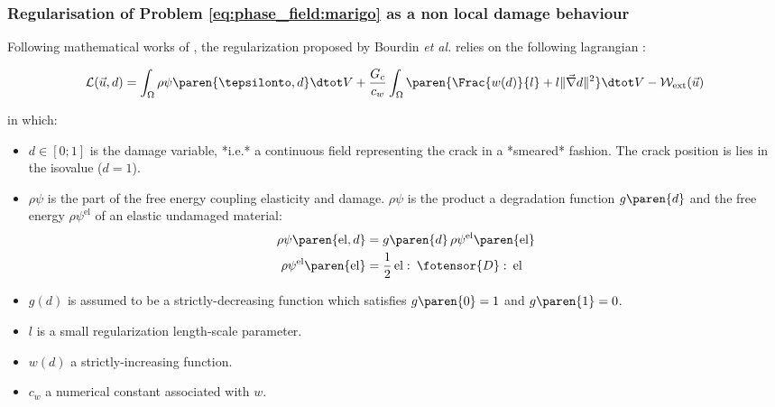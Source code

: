 \subsubsection{Regularisation of Problem \eqref{eq:phase_field:marigo} as a non local damage behaviour}

Following mathematical works of
\cite{ambrosio_approximation_1990}, the regularization proposed by Bourdin \textit{et
al.} relies on the following lagrangian \cite{bourdin_numerical_2000}:

\begin{equation}
    \label{eq:phase_field:Bourdin_Lagrangian}
    \mathcal{L}(\vec{u},d) =
   \int_{\Omega} \rho\psi\paren{\tepsilonto,d} \dtot V
   + \dfrac{G_c}{c_w} \int_{\Omega}\paren{\Frac{w(d)}{l} + l \|\vec{\nabla} d\|^2}\dtot V
   - \mathcal{W}_{\mathrm{ext}}(\vec{u})
\end{equation}

in which:

\begin{itemize}
    \item \(d\in[0;1]\) is the damage variable, *i.e.* a continuous field
    representing the crack in a *smeared* fashion. The crack position is
    lies in the isovalue (\(d=1\)).
    \item \(\rho\psi\) is the part of the free energy coupling elasticity and
    damage. \(\rho\psi\) is the product a degradation function
    \(g\paren{d}\) and the free energy \(\rho\psi^{\mathrm{el}}\) of an
    elastic undamaged material:
    \[
    \begin{aligned}
    \rho\psi\paren{\mathrm{el},d}&=g\paren{d}\,\rho\psi^{\mathrm{el}}\paren{\mathrm{el}}\\
    \rho\psi^{\mathrm{el}}\paren{\mathrm{el}}&=\dfrac{1}{2}\,\mathrm{el}\,\colon\,\fotensor{D}\,\colon\,\mathrm{el}
    \end{aligned}
    \]
    \item \(g(d)\) is assumed to be a strictly-decreasing function which satisfies
    \(g\paren{0}=1\) and \(g\paren{1}=0\).
    \item \(l\) is a small regularization length-scale parameter.
    \item \(w(d)\) a strictly-increasing function.
    \item \(c_w\) a numerical constant associated with \(w\).
\end{itemize}

